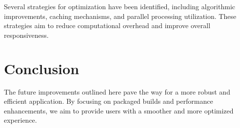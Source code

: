 Several strategies for optimization have been identified, including algorithmic improvements, caching mechanisms, and parallel processing utilization. These strategies aim to reduce computational overhead and improve overall responsiveness.

\section*{Conclusion}

The future improvements outlined here pave the way for a more robust and efficient application. By focusing on packaged builds and performance enhancements, we aim to provide users with a smoother and more optimized experience.













